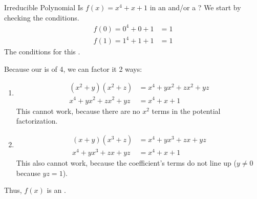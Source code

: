 \begin{example}{Irreducible Polynomial}
  Is $f(x) = x^{4} + x + 1$ in  an   and/or a ?
  \tcblower{}
  We start by checking the  conditions.
  \begin{align*}
    f(0) = 0^{4} + 0 + 1 &= 1 \\
    f(1) = 1^{4} + 1 + 1 &= 1
  \end{align*}
  The  conditions for this .

  Because our  is of  4, we can factor it 2 ways:
  \begin{enumerate}[noitemsep]
  \item \begin{align*}
          \left( x^{2} + y \right) \left( x^{2} + z \right) &= x^{4} + yx^{2} + zx^{2} + yz \\
          x^{4} + yx^{2} + zx^{2} + yz &= x^{4} + x + 1
        \end{align*}
        This cannot work, because there are no $x^{2}$ terms in the potential factorization.
  \item \begin{align*}
          \left( x + y \right) \left( x^{3} + z \right) &= x^{4} + yx^{3} + zx + yz \\
          x^{4} + yx^{3} + zx + yz &= x^{4} + x + 1
        \end{align*}
        This also cannot work, because the coefficient's terms do not line up ($y \neq 0$ because $yz = 1$).
  \end{enumerate}
  Thus, $f(x)$ is an .


\end{example}
